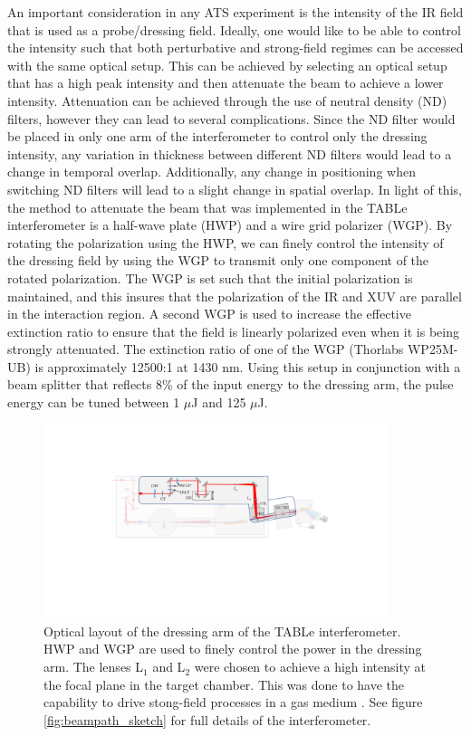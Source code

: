 An important consideration in any ATS experiment is the intensity of the IR field that is used as a probe/dressing field. Ideally, one would like to be able to control the intensity such that both perturbative and strong-field regimes can be accessed with the same optical setup.  This can be achieved by selecting an optical setup that has a high peak intensity and then attenuate the beam 
to achieve a lower intensity.  Attenuation can be achieved through the use of neutral density (ND) filters, however they can lead to several complications.  Since the ND filter would be placed in only one arm of the interferometer to control only the dressing intensity, any variation in thickness between different ND filters would lead to a change in temporal overlap.  Additionally, any change in positioning when switching ND filters will lead to a slight change in spatial overlap. In light of this, the method to attenuate the beam that was implemented in the TABLe interferometer is a half-wave plate (HWP) and a wire grid polarizer (WGP).  By rotating the polarization using the HWP, we can finely control the intensity  of the dressing field by using the WGP to transmit only one component of the rotated polarization.  The WGP is set such that the initial polarization is maintained, and this insures that the polarization of the IR and XUV are parallel in the interaction region.  A second WGP is used to increase the effective extinction ratio to ensure that the field is linearly polarized even when it is being strongly attenuated.  The extinction ratio of one of the WGP (Thorlabs WP25M-UB) is approximately 12500:1 at 1430 nm.  Using this setup in conjunction with a beam splitter that reflects 8\% of the input energy to the dressing arm, the pulse energy can be tuned between 1 $\mu$J and 125 $\mu$J.

\begin{figure}
	\centering
	\includegraphics[width=0.9\textwidth]{figures/Beamline/dressing_arm.pdf}
	\caption[Optical layout of dressing arm]{Optical layout of the dressing arm of the TABLe interferometer. HWP and WGP are used to finely control the power in the dressing arm.  The lenses L$_1$ and L$_2$ were chosen to achieve a high intensity at the focal plane in the target chamber.  This was done to have the capability to drive stong-field processes in a gas medium \cite{kiesewetterDynamicsNearThresholdAttosecond2019}.  See figure \ref{fig:beampath_sketch} for full details of the interferometer.}
	\label{fig:dressing_arm}
\end{figure}

